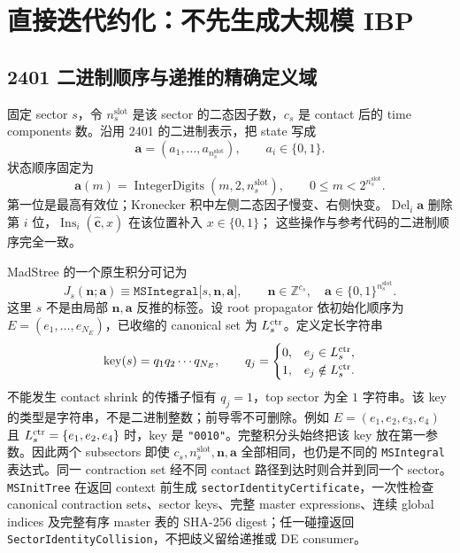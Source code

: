 \documentclass[11pt,a4paper]{ctexart}
\begin{document}
\section{直接迭代约化：不先生成大规模 IBP}

\subsection{2401 二进制顺序与递推的精确定义域}

固定 sector $s$，令 $n_s^{\mathrm{slot}}$ 是该 sector 的二态因子数，$c_s$ 是 contact 后的 time components 数。沿用 2401 的二进制表示，把 state 写成
\begin{equation}
 \bm a=(a_1,\ldots,a_{n_s^{\mathrm{slot}}}),
 \qquad a_i\in\{0,1\}.
\end{equation}
状态顺序固定为
\begin{equation}
 \bm a(m)=\operatorname{IntegerDigits}(m,2,n_s^{\mathrm{slot}}),
 \qquad 0\leq m<2^{n_s^{\mathrm{slot}}}.
 \label{eq:binary-state-order}
\end{equation}
第一位是最高有效位；Kronecker 积中左侧二态因子慢变、右侧快变。$\operatorname{Del}_i\bm a$
删除第 $i$ 位，$\operatorname{Ins}_i(\widehat{\bm c},x)$ 在该位置补入 $x\in\{0,1\}$；
这些操作与参考代码的二进制顺序完全一致。

MadStree 的一个原生积分可记为
\begin{equation}
 J_s(\bm n;\bm a)
 \equiv\texttt{MSIntegral[}s,\bm n,\bm a\texttt{]},
 \qquad
 \bm n\in\mathbb Z^{c_s},
 \quad
 \bm a\in\{0,1\}^{n_s^{\mathrm{slot}}}.
 \label{eq:MSIntegral-domain}
\end{equation}
这里 $s$ 不是由局部 $\bm n,\bm a$ 反推的标签。设 root propagator 依初始化顺序为
$E=(e_1,\ldots,e_{N_E})$，已收缩的 canonical set 为 $L_s^{\rm ctr}$。定义定长字符串
\begin{equation}
 \operatorname{key}(s)=q_1q_2\cdots q_{N_E},\qquad
 q_j=\begin{cases}0,&e_j\in L_s^{\rm ctr},\\1,&e_j\notin L_s^{\rm ctr}.
 \end{cases}
 \label{eq:sector-bit-string-key}
\end{equation}
不能发生 contact shrink 的传播子恒有 $q_j=1$，top sector 为全 $1$ 字符串。该 key 的类型是字符串，不是二进制整数；前导零不可删除。例如 $E=(e_1,e_2,e_3,e_4)$ 且 $L_s^{\rm ctr}=\{e_1,e_2,e_4\}$ 时，key 是 \texttt{"0010"}。完整积分头始终把该 key 放在第一参数。因此两个 subsectors 即使 $c_s,n_s^{\mathrm{slot}},\bm n,\bm a$ 全部相同，也仍是不同的
\texttt{MSIntegral} 表达式。同一 contraction set 经不同 contact 路径到达时则合并到同一个 sector。\texttt{MSInitTree} 在返回 context 前生成
\texttt{sectorIdentityCertificate}，一次性检查 canonical contraction sets、sector keys、完整 master expressions、连续 global indices 及完整有序 master 表的 SHA-256 digest；任一碰撞返回
\texttt{SectorIdentityCollision}，不把歧义留给递推或 DE consumer。
\end{document}
